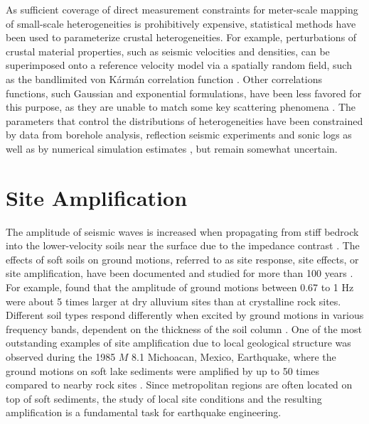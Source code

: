 As sufficient coverage of direct measurement constraints for meter-scale mapping of small-scale heterogeneities is prohibitively expensive, statistical methods have been used to parameterize crustal heterogeneities. For example, perturbations of crustal material properties, such as seismic velocities and densities, can be superimposed onto a reference velocity model via a spatially random field, such as the bandlimited von K\'arm\'an correlation function \citep[][\cref{app:A}]{frankelFiniteDifferenceSimulations1986,hartzellEffects3DRandom2010}. Other correlations functions, such Gaussian and exponential formulations, have been less favored for this purpose, as they are unable to match some key scattering phenomena \citep{frankelFiniteDifferenceSimulations1986}. The parameters that control the distributions of heterogeneities have been constrained by data from borehole analysis, reflection seismic experiments and sonic logs  as well as by numerical simulation estimates \citep{thyboSeismicScatteringTop2003,nielsenIdentificationCrustalUpper2006, przybillaEstimationCrustalScattering2009, imperatoriBroadbandNearfieldGround2013, imperatoriRoleTopographyLateral2015}, but remain somewhat uncertain.


\section{Site Amplification}

The amplitude of seismic waves is increased when propagating from stiff bedrock into the lower-velocity soils near the surface due to the impedance contrast \citep{booreShortperiodSwaveRadiation1986,silvaEngineeringCharacterizationStrong1995}. The effects of soft soils on ground motions, referred to as site response, site effects, or site amplification, have been documented and studied for more than 100 years . For example, \citet{gutenbergEffectsGroundEarthquake1957} found that the amplitude of ground motions between 0.67 to 1 Hz were about 5 times larger at dry alluvium sites than at crystalline rock sites.  Different soil types respond differently when excited by ground motions in various frequency bands, dependent on the thickness of the soil column \citep{akiLocalSiteEffects1993}. One of the most outstanding examples of site amplification due to local geological structure was observed during the 1985 $M$ 8.1 Michoacan, Mexico, Earthquake, where the ground motions on soft lake sediments were amplified by up to 50 times compared to nearby rock sites \citep{singh1993origin}. Since metropolitan regions are often located on top of soft sediments, the study of local site conditions and the resulting amplification is a fundamental task for earthquake engineering.

